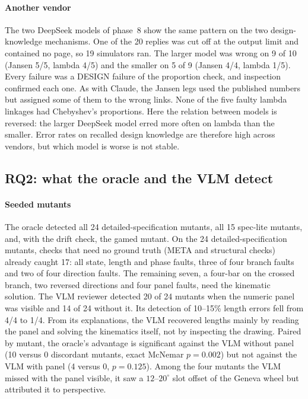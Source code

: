 \paragraph{Another vendor} The two DeepSeek models of phase~8 show the same pattern on the two design-knowledge mechanisms. One of the 20 replies was cut off at the output limit and contained no page, so 19 simulators ran. The larger model was wrong on 9 of 10 (Jansen 5/5, lambda 4/5) and the smaller on 5 of 9 (Jansen 4/4, lambda 1/5). Every failure was a DESIGN failure of the proportion check, and inspection confirmed each one. As with Claude, the Jansen legs used the published numbers but assigned some of them to the wrong links. None of the five faulty lambda linkages had Chebyshev's proportions. Here the relation between models is reversed: the larger DeepSeek model erred more often on lambda than the smaller. Error rates on recalled design knowledge are therefore high across vendors, but which model is worse is not stable.

\subsection{RQ2: what the oracle and the VLM detect}\label{sec:rq2}

\paragraph{Seeded mutants} The oracle detected all 24 detailed-specification mutants, all 15 spec-lite mutants, and, with the drift check, the gamed mutant. On the 24 detailed-specification mutants, checks that need no ground truth (META and structural checks) already caught 17: all state, length and phase faults, three of four branch faults and two of four direction faults. The remaining seven, a four-bar on the crossed branch, two reversed directions and four panel faults, need the kinematic solution. The VLM reviewer detected 20 of 24 mutants when the numeric panel was visible and 14 of 24 without it. Its detection of 10--15\% length errors fell from 4/4 to 1/4. From its explanations, the VLM recovered lengths mainly by reading the panel and solving the kinematics itself, not by inspecting the drawing. Paired by mutant, the oracle's advantage is significant against the VLM without panel (10 versus 0 discordant mutants, exact McNemar $p=0.002$) but not against the VLM with panel (4 versus 0, $p=0.125$). Among the four mutants the VLM missed with the panel visible, it saw a $12$--$20^\circ$ slot offset of the Geneva wheel but attributed it to perspective.


